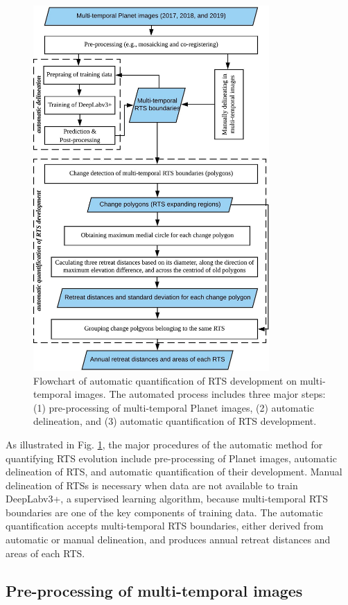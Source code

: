 \documentclass[authoryear,preprint,review,12pt]{elsarticle}
\begin{document}
\begin{figure}
	\centering
	\includegraphics[width=9cm]{figs/polygon_based_change_detection_flowchart.jpg}
	\caption{Flowchart of automatic quantification of RTS development on multi-temporal images. The automated process includes three major steps: (1) pre-processing of multi-temporal Planet images, (2) automatic delineation, and (3) automatic quantification of RTS development.}
	\label{fig_flowchart}
\end{figure}

 As illustrated in Fig. \ref{fig_flowchart}, the major procedures of the automatic method for quantifying RTS evolution include pre-processing of Planet images, automatic delineation of RTS, and automatic quantification of their development. 
Manual delineation of RTSs is necessary when data are not available to train DeepLabv3+, a supervised learning algorithm, because multi-temporal RTS boundaries are one of the key components of training data.
The automatic quantification accepts multi-temporal RTS boundaries, either derived from automatic or manual delineation, and produces annual retreat distances and areas of each RTS. 


\subsection{Pre-processing of multi-temporal images}
\label{sec_preprocessing}
\end{document}
